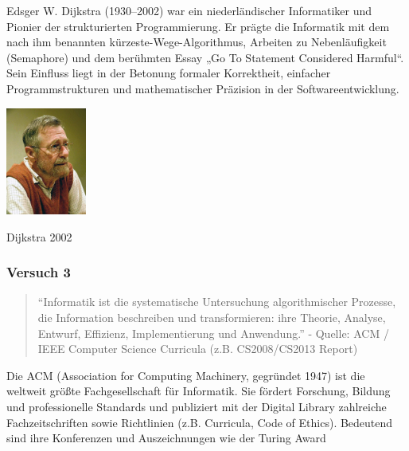 \documentclass[
  11pt,
  a4paper,
  DIV=11,
  numbers=noendperiod]{scrartcl}
\begin{document}
\begin{tcolorbox}[enhanced jigsaw, breakable, coltitle=black, colbacktitle=quarto-callout-tip-color!10!white, colback=white, arc=.35mm, colframe=quarto-callout-tip-color-frame, titlerule=0mm, leftrule=.75mm, title=\textcolor{quarto-callout-tip-color}{\faLightbulb}\hspace{0.5em}{INFO}, toprule=.15mm, bottomtitle=1mm, rightrule=.15mm, bottomrule=.15mm, toptitle=1mm, opacityback=0, left=2mm, opacitybacktitle=0.6]

Edsger W. Dijkstra (1930--2002) war ein niederländischer Informatiker
und Pionier der strukturierten Programmierung. Er prägte die Informatik
mit dem nach ihm benannten kürzeste-Wege-Algorithmus, Arbeiten zu
Nebenläufigkeit (Semaphore) und dem berühmten Essay „Go To Statement
Considered Harmful``. Sein Einfluss liegt in der Betonung formaler
Korrektheit, einfacher Programmstrukturen und mathematischer Präzision
in der Softwareentwicklung.

\includegraphics[width=1.04167in,height=\textheight,keepaspectratio]{images/dijkstra.jpg}

Dijkstra 2002

\end{tcolorbox}

\subsubsection{Versuch 3}\label{versuch-3}

\begin{quote}
``Informatik ist die systematische Untersuchung algorithmischer
Prozesse, die Information beschreiben und transformieren: ihre Theorie,
Analyse, Entwurf, Effizienz, Implementierung und Anwendung.'' - Quelle:
ACM / IEEE Computer Science Curricula (z.B. CS2008/CS2013 Report)
\end{quote}

\begin{tcolorbox}[enhanced jigsaw, breakable, coltitle=black, colbacktitle=quarto-callout-tip-color!10!white, colback=white, arc=.35mm, colframe=quarto-callout-tip-color-frame, titlerule=0mm, leftrule=.75mm, title=\textcolor{quarto-callout-tip-color}{\faLightbulb}\hspace{0.5em}{INFO}, toprule=.15mm, bottomtitle=1mm, rightrule=.15mm, bottomrule=.15mm, toptitle=1mm, opacityback=0, left=2mm, opacitybacktitle=0.6]

Die ACM (Association for Computing Machinery, gegründet 1947) ist die
weltweit größte Fachgesellschaft für Informatik. Sie fördert Forschung,
Bildung und professionelle Standards und publiziert mit der Digital
Library zahlreiche Fachzeitschriften sowie Richtlinien (z.B. Curricula,
Code of Ethics). Bedeutend sind ihre Konferenzen und Auszeichnungen wie
der Turing Award

\end{tcolorbox}
\end{document}

